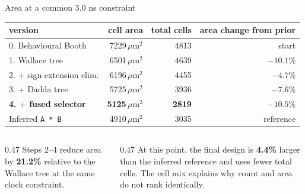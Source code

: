 \documentclass[aspectratio=169,11pt]{beamer}
\newcommand{\umarea}{\ensuremath{\,\mu\mathrm{m}^{2}}}
\begin{document}
\begin{frame}{Area at a common 3.0 ns constraint}

\centering\small
\begin{tabular}{@{}lrrr@{}}
\toprule
version & cell area & total cells & area change from prior \\
\midrule
0. Behavioural Booth & 7229\umarea & 4813 & start \\
1. Wallace tree & 6501\umarea & 4639 & $-10.1\%$ \\
2. $+$ sign-extension elim. & 6196\umarea & 4455 & $-4.7\%$ \\
3. $+$ Dadda tree & 5725\umarea & 3936 & $-7.6\%$ \\
\textbf{4. $+$ fused selector} & \textbf{5125\umarea} & \textbf{2819} & $\mathbf{-10.5\%}$ \\
\midrule
Inferred \texttt{A * B} & 4910\umarea & 3035 & reference \\
\bottomrule
\end{tabular}

\vspace{10pt}
\begin{columns}[T]
\begin{column}{0.47\textwidth}
\small
Steps 2--4 reduce area by \textbf{21.2\%} relative to the Wallace tree at the
same clock constraint.
\end{column}
\begin{column}{0.47\textwidth}
\small
At this point, the final design is \textbf{4.4\%} larger than the inferred
reference and uses fewer total cells. The cell mix explains why count and area
do not rank identically.
\end{column}
\end{columns}

\end{frame}
\end{document}
